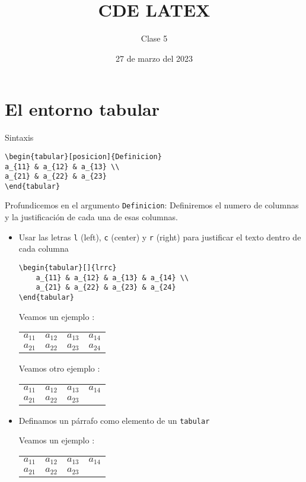 \documentclass[]{article}
\title{CDE LATEX }
\author{Clase 5}
\date{27 de marzo del 2023}
\begin{document}
\maketitle

\begin{abstract}
	\lipsum[2]
\end{abstract}

\section{El entorno tabular}
\noindent Sintaxis

\begin{verbatim}
\begin{tabular}[posicion]{Definicion}
a_{11} & a_{12} & a_{13} \\
a_{21} & a_{22} & a_{23}
\end{tabular}
\end{verbatim}

Profundicemos en el argumento \verb*|Definicion|:
Definiremos el numero de columnas y la justificación
de cada una de esas columnas.
\begin{itemize}
\item Usar las letras \verb*|l| (left), \verb*|c| (center) y \verb*|r| (right) para justificar el 
texto dentro de cada columna
\begin{verbatim}
\begin{tabular}[]{lrrc}
	a_{11} & a_{12} & a_{13} & a_{14} \\
	a_{21} & a_{22} & a_{23} & a_{24}
\end{tabular}
\end{verbatim}

Veamos un ejemplo :

\begin{tabular}[]{lrrc}
	$a_{11}$ & $a_{12}$ & $a_{13}$ & $a_{14}$ \\
	$a_{21}$ & $a_{22}$ & $a_{23}$ & $a_{24}$
\end{tabular}

Veamos otro ejemplo :

\begin{tabular}[]{lrrc}
	$a_{11}$ & $a_{12}$ & $a_{13}$ & $a_{14}$ \\
	$a_{21}$ & $a_{22}$ & $a_{23}$ & \lipsum[2]
\end{tabular}

\item Definamos un párrafo como elemento de un 
\verb*|tabular|

Veamos un ejemplo :

\begin{tabular}[]{lrrp{9cm}}
	$a_{11}$ & $a_{12}$ & $a_{13}$ & $a_{14}$ \\
	$a_{21}$ & $a_{22}$ & $a_{23}$ & \lipsum[2]
\end{tabular}




\end{itemize}
\end{document}
